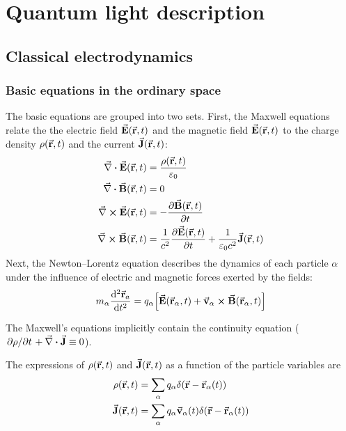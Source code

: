 \section{Quantum light description}
\subsection{Classical electrodynamics}
\subsubsection*{Basic equations in the ordinary space}
The basic equations are grouped into two sets. First, the Maxwell equations relate the the electric field $\va{E}(\va{r}, t)$ and the magnetic field $\va{E}(\va{r}, t)$ to the charge density $\rho(\va{r}, t)$ and the current $\va{J}(\va{r}, t)$:
\begin{subequations}
\begin{align}
	\div{E}(\va{r}, t) &= \frac{\rho(\va{r}, t)}{\varepsilon_{0}} \label{eq:max1} \\
	\div{B}(\va{r}, t) &= 0 \label{eq:max2} \\
	\curl{E}(\va{r}, t) &= - \pdv{\va{B}(\va{r}, t)}{t} \label{eq:max3} \\
	\curl{B}(\va{r}, t) &= \frac{1}{c^{2}} \pdv{\va{E}(\va{r}, t)}{t} + \frac{1}{\varepsilon_{0} c^{2}} \va{J}(\va{r}, t) \label{eq:max4}
\end{align}
\end{subequations}
Next, the Newton--Lorentz equation describes the dynamics of each particle $\alpha$ under the influence of electric and magnetic forces exerted by the fields:
\begin{align}
	m_{\alpha} \dv[2]{\va{r}_{a}}{t} = q_{\alpha} \qty[ \va{E}(\va{r}_{\alpha}, t) + \va{v}_{\alpha} \cross \va{B}(\va{r}_{\alpha}, t) ]
\end{align}

The Maxwell's equations implicitly contain the continuity equation ($\pdv*{\rho}{t} + \div{J} \equiv 0$).

The expressions of $\rho(\va{r}, t)$ and $\va{J}(\va{r}, t)$ as a function of the particle variables are
\begin{align}
	\rho(\va{r}, t) &= \sum_{\alpha} q_{\alpha} \delta(\va{r} - \va{r}_{\alpha}(t)) \\
	\va{J}(\va{r}, t) &= \sum_{\alpha} q_{\alpha} \va{v}_{\alpha}(t) \delta(\va{r} - \va{r}_{\alpha}(t))
\end{align}

